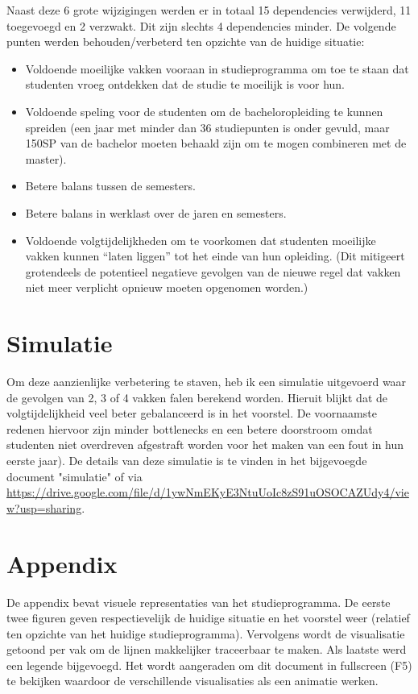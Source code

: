 \documentclass[a4paper]{article}
\begin{document}
    Naast deze 6 grote wijzigingen werden er in totaal 15 dependencies verwijderd, 11 toegevoegd en 2 verzwakt. Dit zijn slechts 4 dependencies minder. De volgende punten werden behouden/verbeterd ten opzichte van de huidige situatie:
    \begin{itemize}
        \item Voldoende moeilijke vakken vooraan in studieprogramma om toe te staan dat studenten vroeg ontdekken dat de studie te moeilijk is voor hun.
        \item Voldoende speling voor de studenten om de bacheloropleiding te kunnen spreiden (een jaar met minder dan 36 studiepunten is onder gevuld, maar 150SP van de bachelor moeten behaald zijn om te mogen combineren met de master).
        \item Betere balans tussen de semesters.
        \item Betere balans in werklast over de jaren en semesters.
        \item Voldoende volgtijdelijkheden om te voorkomen dat studenten moeilijke vakken kunnen “laten liggen” tot het einde van hun opleiding. (Dit mitigeert grotendeels de potentieel negatieve gevolgen van de nieuwe regel dat vakken niet meer verplicht opnieuw moeten opgenomen worden.)
    \end{itemize}

    \section{Simulatie}
    \label{sec:simulatie}

    Om deze aanzienlijke verbetering te staven, heb ik een simulatie uitgevoerd waar de gevolgen van 2, 3 of 4 vakken falen berekend worden. Hieruit blijkt dat de volgtijdelijkheid veel beter gebalanceerd is in het voorstel. De voornaamste redenen hiervoor zijn minder bottlenecks en een betere doorstroom omdat studenten niet overdreven afgestraft worden voor het maken van een fout in hun eerste jaar). De details van deze simulatie is te vinden in het bijgevoegde document "simulatie" of via \url{https://drive.google.com/file/d/1ywNmEKyE3NtuUoIc8zS91uOSOCAZUdy4/view?usp=sharing}.

    \appendix
    \section{Appendix}
    \label{sec:appenix}

    De appendix bevat visuele representaties van het studieprogramma. De eerste twee figuren geven respectievelijk de huidige situatie en het voorstel weer (relatief ten opzichte van het huidige studieprogramma). Vervolgens wordt de visualisatie getoond per vak om de lijnen makkelijker traceerbaar te maken. Als laatste werd een legende bijgevoegd. Het wordt aangeraden om dit document in fullscreen (F5) te bekijken waardoor de verschillende visualisaties als een animatie werken.
\end{document}
